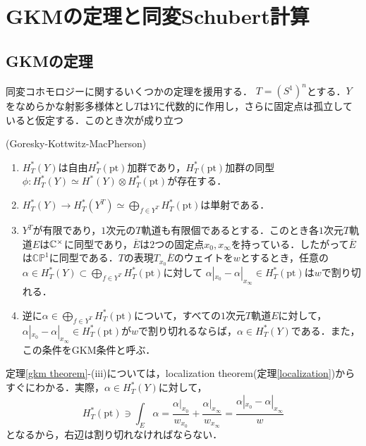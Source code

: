 \section{GKMの定理と同変Schubert計算}
\subsection{GKMの定理}
同変コホモロジーに関するいくつかの定理を援用する．
$T=(S^1)^n$とする．$Y$をなめらかな射影多様体とし$T$は$Y$に代数的に作用し，さらに固定点は孤立していると仮定する．このとき次が成り立つ

\begin{theo}(Goresky-Kottwitz-MacPherson\cite{GKM})\label{gkm theorem}
  \begin{enumerate}
    \item $H^*_T(Y)$は自由$H^*_T(\text{pt})$加群であり，$H^*_T(\text{pt})$加群の同型$\phi\colon H^*_T(Y)\simeq H^*(Y)\otimes H^*_T(\text{pt})$が存在する．
    
    \item $H^*_T(Y)\rightarrow H^*_T(Y^T) \simeq \bigoplus_{f\in Y^T}H^*_T(\text{pt})$は単射である．

    \item $Y^T$が有限であり，$1$次元の$T$軌道も有限個であるとする．このとき各$1$次元$T$軌道$E$は$\mathbb{C}^\times$に同型であり，$\overline{E}$は$2$つの固定点$x_0,x_\infty$を持っている．したがって$\overline{E}$は$\mathbb{CP}^1$に同型である．$T$の表現$T_{x_0}\overline{E}$のウェイトを$w$とするとき，任意の$\alpha\in H^*_T(Y)\subset \bigoplus_{f\in Y^T}H^*_T(\text{pt})$に対して
    $\alpha|_{x_0} - \alpha|_{x_\infty}\in H^*_T(\text{pt})$は$w$で割り切れる．
  
    \item 逆に$\alpha\in \bigoplus_{f\in Y^T}H^*_T(\text{pt})$について，すべての$1$次元$T$軌道$E$に対して，$\alpha|_{x_0} - \alpha|_{x_\infty}\in H^*_T(\text{pt})$が$w$で割り切れるならば，$\alpha\in H^*_T(Y)$である．また，この条件をGKM条件と呼ぶ．
  \end{enumerate}
\end{theo}

定理\ref{gkm theorem}-(iii)については，localization theorem(定理\ref{localization})からすぐにわかる．実際，$\alpha\in H^*_T(Y)$に対して，
\[
H^*_T(\text{pt})\owns\int_E\alpha = \frac{\alpha|_{x_0}}{w_{x_0}} + \frac{\alpha|_{x_\infty}}{w_{x_\infty}} = \frac{\alpha|_{x_0}-\alpha|_{x_\infty}}{w}
\]
となるから，右辺は割り切れなければならない．


